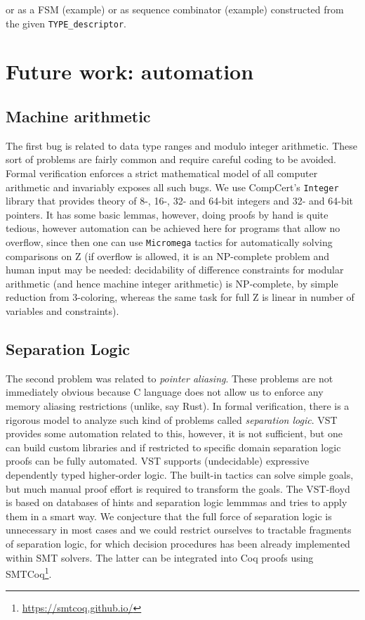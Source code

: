 \documentclass[acmsmall,nonacm]{acmart}
\begin{document}
 or as a FSM (example) or as sequence combinator (example) constructed from the given \texttt{TYPE\_descriptor}.


\section{Future work: automation}


\subsection{Machine arithmetic}

The first bug is related to data type ranges and modulo integer
arithmetic. These sort of problems are fairly common and require
careful coding to be avoided. Formal verification enforces a strict
mathematical model of all computer arithmetic and invariably exposes
all such bugs. We use CompCert's \texttt{Integer} library that
provides theory of 8-, 16-, 32- and 64-bit integers and 32- and 64-bit
pointers. It has some basic lemmas, however, doing proofs by hand is
quite tedious, however automation can be achieved here for programs
that allow no overflow, since then one can use
\texttt{Micromega}
tactics for automatically solving comparisons on Z (if overflow is
allowed, it is an NP-complete problem and human input may be needed:
decidability of difference constraints for modular arithmetic (and
hence machine integer arithmetic) is NP-complete, by simple reduction
from 3-coloring\cite{PointerConstraintsNP}, whereas the same task for
full Z is linear in number of variables and constraints).


\subsection{Separation Logic}

The second problem was related to \textit{pointer aliasing}. These problems are not immediately obvious because C language does not allow us to enforce any memory aliasing restrictions (unlike, say Rust). In formal verification, there is a rigorous model to analyze such kind of problems called \textit{separation logic}. VST provides some automation related to this, however, it is not sufficient, but one can build custom libraries and if restricted to specific domain separation logic proofs can be fully automated. VST supports (undecidable) expressive dependently typed higher-order logic. The built-in tactics can solve simple goals, but much manual proof effort is required to transform the goals. The VST-floyd is based on databases of hints and separation logic lemmmas and tries to apply them in a smart way. We conjecture that the full force of separation logic is unnecessary in most cases and we could restrict ourselves to tractable fragments of separation logic, for which decision procedures has been already implemented within SMT solvers. The latter can be integrated into Coq proofs using SMTCoq\footnote{\url{https://smtcoq.github.io/}}.
\end{document}
